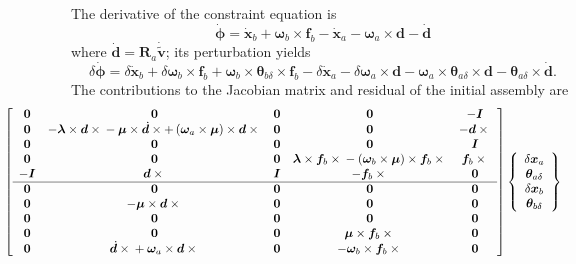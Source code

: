 \documentclass[10pt,dvips,fleqn,subeqn]{report}
\newcommand{\T}[1]{\bm{#1}}
\begin{document}
The derivative of the constraint equation is
\begin{equation}
	\dot{\T{\phi}} = 
		\dot{\T{x}}_b
		+ \T{\omega}_b \times \T{f}_b
		- \dot{\T{x}}_a
		- \T{\omega}_a \times \T{d}
		- \dot{\T{d}}
\end{equation}
where $\dot{\T{d}}=\T{R}_a\dot{\tilde{\T{v}}}$; its perturbation yields
\begin{equation}
	\delta\dot{\T{\phi}}
	= \delta\dot{\T{x}}_b
	+ \delta\T{\omega}_b \times \T{f}_b
	+ \T{\omega}_b \times \T{\theta}_{b\delta} \times \T{f}_b
	- \delta\dot{\T{x}}_a
	- \delta\T{\omega}_a \times \T{d}
	- \T{\omega}_a \times \T{\theta}_{a\delta} \times \T{d}
	- \T{\theta}_{a\delta} \times \dot{\T{d}} .
\end{equation}
The contributions to the Jacobian matrix and residual 
of the initial assembly are
\begin{align}
	\small
	& \hspace{-20mm}\sqbr{\matr{ccccc}{
		\T{0} & \T{0} & \T{0} & \T{0} & -\T{I} \\	%
		\T{0} & -\T{\lambda}\times\T{d}\times{}
			- \T{\mu}\times\dot{\T{d}}\times
			+ \plbr{\T{\omega}_a\times\T{\mu}}\times\T{d}\times{} &
			\T{0} & \T{0} & -\T{d}\times{} \\	%
		\T{0} & \T{0} & \T{0} & \T{0} & \T{I} \\	%
		\T{0} & \T{0} & \T{0} & 
			\T{\lambda}\times\T{f}_b\times{}
			- \plbr{\T{\omega}_b\times\T{\mu}}\times\T{f}_b\times{} &
			\T{f}_b\times{} \\	%
		-\T{I} & \T{d}\times{} & \T{I} & -\T{f}_b\times{} &
			\T{0} \\				%
%
	\hline
		\T{0} & \T{0} & \T{0} & \T{0} & \T{0} \\	%
		\T{0} & -\T{\mu}\times\T{d}\times{} &
			\T{0} & \T{0} & \T{0} \\		%
		\T{0} & \T{0} & \T{0} & \T{0} & \T{0} \\	%
		\T{0} & \T{0} & \T{0} &
			\T{\mu}\times\T{f}_b\times{} & \T{0} \\	%
		\T{0} &
			\dot{\T{d}}\times{}
			+ \T{\omega}_a\times\T{d}\times{} &
			\T{0} &
			-\T{\omega}_b\times\T{f}_b\times{} &
			\T{0}					%
	}} \cubr{\cvvect{
		\delta\T{x}_a \\
		\T{\theta}_{a\delta} \\
		\delta\T{x}_b \\
		\T{\theta}_{b\delta} \\
}}
\end{align}
\end{document}

